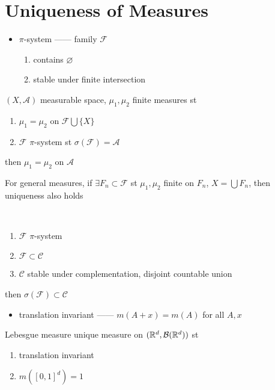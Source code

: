 \section{Uniqueness of Measures}\label{sec:uniqueness-of-measures}

\begin{itemize}
    \item $\pi$-system ------ family $\mathcal{F}$
    \begin{enumerate}
        \item contains $\varnothing$
        \item stable under finite intersection
    \end{enumerate}
\end{itemize}

\begin{prop}
    $(X, \mathcal{A})$ measurable space, $\mu_1, \mu_2$ finite measures st
    \begin{enumerate}
        \item $\mu_1 = \mu_2$ on $\mathcal{F} \bigcup \{X\}$
        \item $\mathcal{F}$ $\pi$-system st $\sigma(\mathcal{F}) = \mathcal{A}$
    \end{enumerate}
    then $\mu_1 = \mu_2$ on $\mathcal{A}$
\end{prop}

\begin{fact}
    For general measures, if $\exists F_n \subset \mathcal{F}$ st $\mu_1, \mu_2$ finite on $F_n$, $X = \bigcup F_n$, then uniqueness also holds
\end{fact}

\begin{lemma}\,
    \begin{enumerate}
        \item $\mathcal{F}$ $\pi$-system
        \item $\mathcal{F} \subset \mathcal{C}$
        \item $\mathcal{C}$ stable under complementation, disjoint countable union
    \end{enumerate}
    then $\sigma(\mathcal{F}) \subset \mathcal{C}$
\end{lemma}

\begin{itemize}
    \item translation invariant ------ $m(A + x) = m(A)$ for all $A, x$
\end{itemize}

\begin{prop}
    Lebesgue measure unique measure on $(\mathbb{R}^d, \mathcal{B}(\mathbb{R}^d))$ st
    \begin{enumerate}
        \item translation invariant
        \item $m([0, 1]^d) = 1$
    \end{enumerate}
\end{prop}



